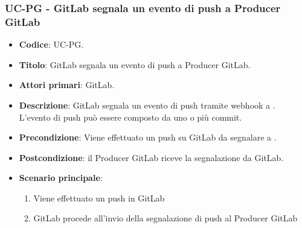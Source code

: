 \subsubsection{UC\theuccount-PG - GitLab segnala un evento di push a Producer GitLab}
	\begin{itemize}
		\item \textbf{Codice}: UC\theuccount-PG.
		\item \textbf{Titolo}: GitLab segnala un evento di push a Producer GitLab.
		\item \textbf{Attori primari}: GitLab.
		\item \textbf{Descrizione}: GitLab segnala un evento di push tramite webhook a \progetto. L'evento di	push può essere composto da uno o più commit.
		\item \textbf{Precondizione}: Viene effettuato un push su GitLab da segnalare a \progetto.
		\item \textbf{Postcondizione}: il Producer GitLab riceve la segnalazione da GitLab.
		\item \textbf{Scenario principale}: 
		\begin{enumerate}
			\item Viene effettuato un push in GitLab
			\item GitLab procede all'invio della segnalazione di push al Producer GitLab
		\end{enumerate}
		
	\end{itemize}